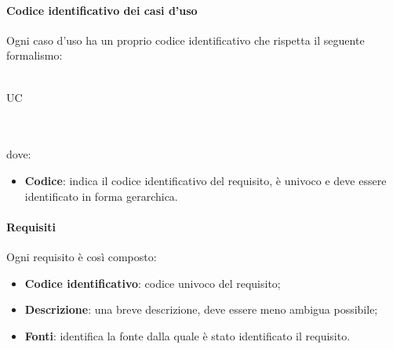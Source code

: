  \paragraph{Codice identificativo dei casi d'uso}
Ogni caso d'uso ha un proprio codice identificativo  che rispetta il seguente formalismo:\\ \\
\centerline{UC\textbraceright{}}
\\ \\dove:
\begin{itemize}
	\item \textbf{Codice}: indica il codice identificativo del requisito, è univoco e deve essere identificato in forma gerarchica.
\end{itemize}
 \paragraph{Requisiti}
 Ogni requisito è così composto:
  \begin{itemize}
  \item \textbf{Codice identificativo}: codice univoco del requisito;
  \item \textbf{Descrizione}: una breve descrizione, deve essere meno ambigua possibile;
  \item \textbf{Fonti}: identifica la fonte dalla quale è stato identificato il requisito.
 \end{itemize}
